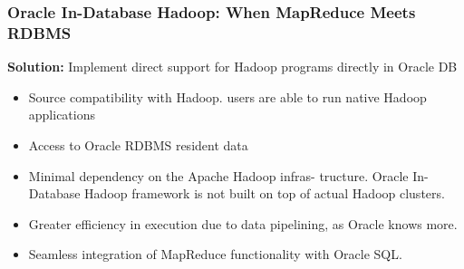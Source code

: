 % 
% 
% 
% 
% 
% 
% 
% 


\begin{frame} [plain] %
\frametitle{Oracle In-Database Hadoop: When MapReduce Meets RDBMS}

\textbf{Solution:} Implement direct support for Hadoop programs directly in Oracle DB
\begin{itemize}
\item  Source compatibility with Hadoop. users are
able to run native Hadoop applications
 
\item Access to Oracle RDBMS resident data 
 
\item Minimal dependency on the Apache Hadoop infras-
tructure. Oracle In-Database Hadoop framework
is not built on top of actual Hadoop clusters.
 
\item Greater efficiency in execution due to data pipelining,
as Oracle knows more.

\item  Seamless integration of MapReduce functionality with
Oracle SQL. 
\end{itemize}
\end{frame}











% 
% 
% 


